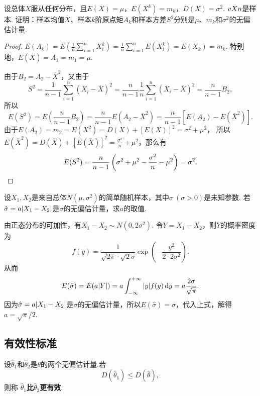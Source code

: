 \begin{example}
设总体\(X\)服从任何分布，且\(E(X)=\mu\)，\(E(X^k)=m_k\)，\(D(X)=\sigma^2\).
\(v{X}{n}\)是样本.
证明：样本均值\(\overline{X}\)、样本\(k\)阶原点矩\(A_k\)和样本方差\(S^2\)分别是\(\mu\)、\(m_k\)和\(\sigma^2\)的无偏估计量.
\begin{proof}
\(E(A_k)=E\left(\frac{1}{n} \sum\limits_{i=1}^n{X_i^k}\right)
=\frac{1}{n} \sum\limits_{i=1}^n{E(X_i^k)} = E(X_k) = m_k\).
特别地，\(E(\overline{X}) = A_1 = m_1 = \mu\).

由于\(B_2 = A_2 - \overline{X}^2\)，又由于\[
S^2 = \frac{1}{n-1} \sum\limits_{i=1}^n{(X_i-\overline{X})^2}
= \frac{n}{n-1} \frac{1}{n} \sum\limits_{i=1}^n{(X_i-\overline{X})^2}
= \frac{n}{n-1} B_2,
\]所以\[
E(S^2) = E\left(\frac{n}{n-1} B_2\right) = \frac{n}{n-1} E(A_2-\overline{X}^2) = \frac{n}{n-1}[E(A_2)-E(\overline{X}^2)].
\]
由于\(E(A_2) = m_2 = E(X^2) = D(X)+[E(X)]^2 = \sigma^2+\mu^2\)，%
所以\(E(\overline{X}^2) = D(\overline{X})+[E(\overline{X})]^2 = \frac{\sigma^2}{n} + \mu^2\)，那么有\[
E(S^2) = \frac{n}{n-1} \left(\sigma^2 + \mu^2 - \frac{\sigma^2}{n} - \mu^2\right) = \sigma^2.
\qedhere
\]
\end{proof}
\end{example}

\begin{example}
设\(X_1,X_2\)是来自总体\(N(\mu,\sigma^2)\)的简单随机样本，其中\(\sigma\ (\sigma>0)\)是未知参数.
若\(\hat{\sigma} = a\abs{X_1-X_2}\)是\(\sigma\)的无偏估计量，求\(a\)的取值.
\begin{solution}
由正态分布的可加性，有\(X_1-X_2 \sim N(0,2\sigma^2)\).
令\(Y = X_1-X_2\)，则\(Y\)的概率密度为\[
f(y) = \frac{1}{\sqrt{2\pi} \cdot \sqrt{2} \sigma} \exp(-\frac{y^2}{2 \cdot 2 \sigma^2}).
\]从而\[
E(\hat{\sigma}) = E(a \abs{Y})
= a \int_{-\infty}^{+\infty} \abs{y} f(y) \dd{y}
= a \frac{2 \sigma}{\sqrt{\pi}}.
\]因为\(\hat{\sigma} = a\abs{X_1-X_2}\)是\(\sigma\)的无偏估计量，所以\(E(\hat{\sigma}) = \sigma\)，代入上式，解得\(a = \sqrt{\pi}/2\).
\end{solution}
\end{example}

\subsection{有效性标准}
\begin{definition}
设\(\hat{\theta}_1\)和\(\hat{\theta}_2\)是\(\theta\)的两个无偏估计量.若\[
D(\hat{\theta}_1) \leqslant D(\hat{\theta}),
\]则称\textbf{ \(\hat{\theta}_1\)比\(\hat{\theta}_2\)更有效}.
\end{definition}

